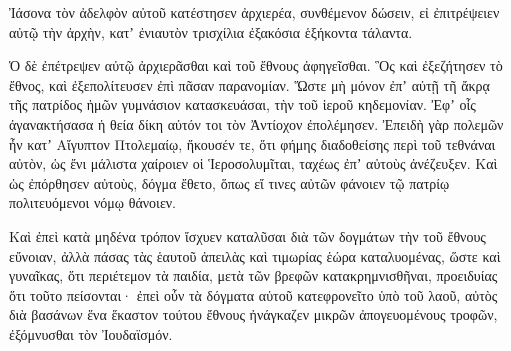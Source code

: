 {Ἰάσονα τὸν ἀδελφὸν αὐτοῦ κατέστησεν ἀρχιερέα, συνθέμενον δώσειν, εἰ ἐπιτρέψειεν αὐτῷ τὴν ἀρχὴν, κατʼ ἐνιαυτὸν τρισχίλια ἐξακόσια ἑξήκοντα τάλαντα.
\par }{\PP {}Ὁ δὲ ἐπέτρεψεν αὐτῷ ἀρχιερᾶσθαι καὶ τοῦ ἔθνους ἀφηγεῖσθαι.
Ὃς καὶ ἐξεζήτησεν τὸ ἔθνος, καὶ ἐξεπολίτευσεν ἐπὶ πᾶσαν παρανομίαν.
Ὥστε μὴ μόνον ἐπʼ αὐτῇ τῆ ἄκρᾳ τῆς πατρίδος ἡμῶν γυμνάσιον κατασκευάσαι, τὴν τοῦ ἱεροῦ κηδεμονίαν.
Ἐφʼ οἷς ἀγανακτήσασα ἡ θεία δίκη αὐτόν τοι τὸν Ἀντίοχον ἐπολέμησεν.
Ἐπειδὴ γὰρ πολεμῶν ἦν κατʼ Αἴγυπτον Πτολεμαίῳ, ἤκουσέν τε, ὅτι φήμης διαδοθείσης περὶ τοῦ τεθνάναι αὐτὸν, ὡς ἔνι μάλιστα χαίροιεν οἱ Ἱεροσολυμῖται, ταχέως ἐπʼ αὐτοὺς ἀνέζευξεν.
Καὶ ὡς ἐπόρθησεν αὐτοὺς, δόγμα ἔθετο, ὅπως εἴ τινες αὐτῶν φάνοιεν τῷ πατρίῳ πολιτευόμενοι νόμῳ θάνοιεν.
\par }{\PP {}Καὶ ἐπεὶ κατὰ μηδένα τρόπον ἴσχυεν καταλῦσαι διὰ τῶν δογμάτων τὴν τοῦ ἔθνους εὔνοιαν, ἀλλὰ πάσας τὰς ἑαυτοῦ ἀπειλὰς καὶ τιμωρίας ἑώρα καταλυομένας,
ὥστε καὶ γυναῖκας, ὅτι περιέτεμον τὰ παιδία, μετὰ τῶν βρεφῶν κατακρημνισθῆναι, προειδυίας ὅτι τοῦτο πείσονται·
ἐπεὶ οὖν τὰ δόγματα αὑτοῦ κατεφρονεῖτο ὑπὸ τοῦ λαοῦ, αὐτὸς διὰ βασάνων ἕνα ἕκαστον τούτου ἔθνους ἠνάγκαζεν μικρῶν ἀπογευομένους τροφῶν, ἐξόμνυσθαι τὸν Ἰουδαϊσμόν.

}
